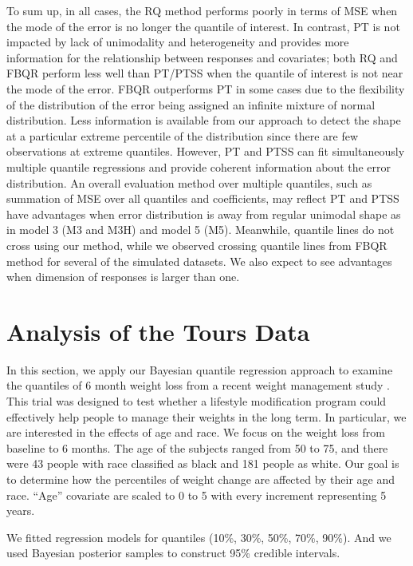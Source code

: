 \documentclass[12pt]{article}
\begin{document}
To sum up, in all cases, the RQ method performs poorly in terms of MSE
when the mode of the error is no longer the quantile of interest. In
contrast, PT is not impacted by lack of unimodality and heterogeneity
and provides more information for the relationship between responses
and covariates; both RQ and FBQR perform less well than PT/PTSS when the quantile of interest is not near the mode of the error. FBQR outperforms PT in some cases due to the flexibility of the distribution of the error being
assigned an infinite mixture of normal distribution. Less
information is available from our approach to detect the shape at a
particular extreme percentile of the distribution since there are few
observations at extreme quantiles. However, PT and PTSS can fit
simultaneously multiple quantile regressions and provide coherent
information about the error distribution.  An overall evaluation
method over multiple quantiles, such as summation of MSE over all
quantiles and coefficients, may reflect PT and PTSS have advantages
when error distribution is away from regular unimodal shape as in
model 3 (M3 and M3H) and model 5 (M5).  Meanwhile, quantile lines do
not cross using our method, while we observed crossing quantile lines
from FBQR method for several of the simulated datasets.  We also expect to
see advantages when dimension of responses is larger than one.


\section{Analysis of the Tours Data}
\label{ch2:sec:tours}
In this section, we apply our Bayesian quantile regression approach to
examine the quantiles of 6 month weight loss from a recent weight
management study \citep{perri2008extended}.  This trial was designed
to test whether a lifestyle modification program could effectively
help people to manage their weights in the long term.  In particular,
we are interested in the effects of age and race.  We focus on the
weight loss from baseline to 6 months. The age of the subjects ranged
from 50 to 75, and there were 43 people with race classified as black
and 181 people as white.  Our goal is to determine how the percentiles
of weight change are affected by their age and race.  ``Age''
covariate are scaled to 0 to 5 with every increment representing 5
years.

We fitted regression models for quantiles (10\%, 30\%, 50\%, 70\%,
90\%). And we used Bayesian posterior samples to construct 95\%
credible intervals.
\end{document}
